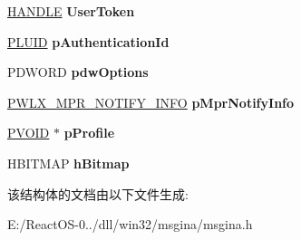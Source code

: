 \begin{DoxyCompactItemize}
\mbox{\label{struct_g_i_n_a___c_o_n_t_e_x_t_a60555623d2cbff440b8674034e1b1b3a}} 
\hyperlink{interfacevoid}{H\+A\+N\+D\+LE} {\bfseries User\+Token}
\item 
\mbox{\label{struct_g_i_n_a___c_o_n_t_e_x_t_a26fb890957d5dceb1550b06e55115c41}} 
\hyperlink{struct___l_u_i_d}{P\+L\+U\+ID} {\bfseries p\+Authentication\+Id}
\item 
\mbox{\label{struct_g_i_n_a___c_o_n_t_e_x_t_aeee7336ef6cce5129a3b9a6daac5f43d}} 
P\+D\+W\+O\+RD {\bfseries pdw\+Options}
\item 
\mbox{\label{struct_g_i_n_a___c_o_n_t_e_x_t_a90d95363bece91af9bc590646550e3c3}} 
\hyperlink{struct___w_l_x___m_p_r___n_o_t_i_f_y___i_n_f_o}{P\+W\+L\+X\+\_\+\+M\+P\+R\+\_\+\+N\+O\+T\+I\+F\+Y\+\_\+\+I\+N\+FO} {\bfseries p\+Mpr\+Notify\+Info}
\item 
\mbox{\label{struct_g_i_n_a___c_o_n_t_e_x_t_a89aa1ddd245ed9344340d0e2a5895de6}} 
\hyperlink{interfacevoid}{P\+V\+O\+ID} $\ast$ {\bfseries p\+Profile}
\item 
\mbox{\label{struct_g_i_n_a___c_o_n_t_e_x_t_abf23c444144aec6bd9a0fd2cbe8d9c61}} 
H\+B\+I\+T\+M\+AP {\bfseries h\+Bitmap}
\end{DoxyCompactItemize}


该结构体的文档由以下文件生成\+:\begin{DoxyCompactItemize}
\item 
E\+:/\+React\+O\+S-\/0../dll/win32/msgina/msgina.\+h\end{DoxyCompactItemize}
